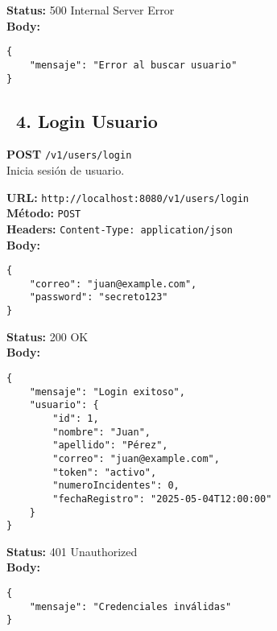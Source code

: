 \begin{tcolorbox}[response]
    \textbf{Status:} 500 Internal Server Error\\
    \textbf{Body:}
    \begin{verbatim}
{
    "mensaje": "Error al buscar usuario"
}
    \end{verbatim}
\end{tcolorbox}

\subsection*{\faServer\ 4. Login Usuario}
\begin{tcolorbox}[endpoint]
    \textbf{POST} \texttt{/v1/users/login}\\
    Inicia sesión de usuario.
\end{tcolorbox}

\begin{tcolorbox}[request]
    \textbf{URL:} \textcolor{urlColor}{\texttt{http://localhost:8080/v1/users/login}}\\
    \textbf{Método:} \textcolor{methodColor}{\texttt{POST}}\\
    \textbf{Headers:} \textcolor{headerColor}{\texttt{Content-Type: application/json}}\\
    \textbf{Body:}
    \begin{verbatim}
{
    "correo": "juan@example.com",
    "password": "secreto123"
}
    \end{verbatim}
\end{tcolorbox}

\begin{tcolorbox}[response]
    \textbf{Status:} 200 OK\\
    \textbf{Body:}
    \begin{verbatim}
{
    "mensaje": "Login exitoso",
    "usuario": {
        "id": 1,
        "nombre": "Juan",
        "apellido": "Pérez",
        "correo": "juan@example.com",
        "token": "activo",
        "numeroIncidentes": 0,
        "fechaRegistro": "2025-05-04T12:00:00"
    }
}
    \end{verbatim}
\end{tcolorbox}

\begin{tcolorbox}[response]
    \textbf{Status:} 401 Unauthorized\\
    \textbf{Body:}
    \begin{verbatim}
{
    "mensaje": "Credenciales inválidas"
}
    \end{verbatim}
\end{tcolorbox}

